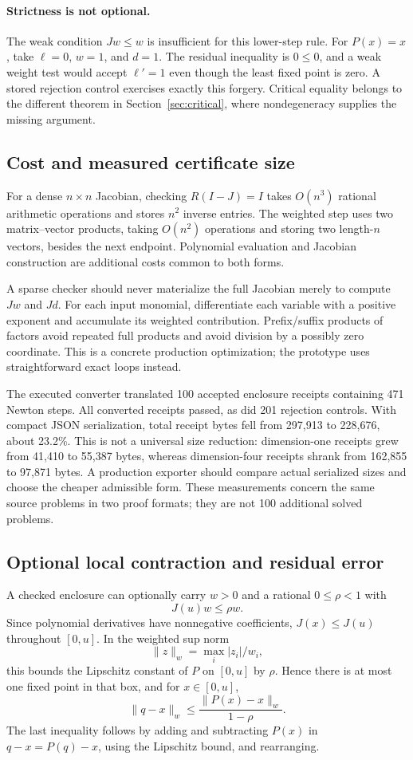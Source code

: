\documentclass[11pt,a4paper]{article}
\theoremstyle{definition}\newtheorem{definition}[theorem]{Definition}
\theoremstyle{remark}\newtheorem{remark}[theorem]{Remark}
\begin{document}
\paragraph{Strictness is not optional.}
The weak condition $Jw\le w$ is insufficient for this lower-step rule. For $P(x)=x$, take $\ell=0$, $w=1$, and $d=1$. The residual inequality is $0\le0$, and a weak weight test would accept $\ell'=1$ even though the least fixed point is zero. A stored rejection control exercises exactly this forgery. Critical equality belongs to the different theorem in Section~\ref{sec:critical}, where nondegeneracy supplies the missing argument.

\subsection{Cost and measured certificate size}
For a dense $n\times n$ Jacobian, checking $R(I-J)=I$ takes $O(n^3)$ rational arithmetic operations and stores $n^2$ inverse entries. The weighted step uses two matrix--vector products, taking $O(n^2)$ operations and storing two length-$n$ vectors, besides the next endpoint. Polynomial evaluation and Jacobian construction are additional costs common to both forms.

A sparse checker should never materialize the full Jacobian merely to compute $Jw$ and $Jd$. For each input monomial, differentiate each variable with a positive exponent and accumulate its weighted contribution. Prefix/suffix products of factors avoid repeated full products and avoid division by a possibly zero coordinate. This is a concrete production optimization; the prototype uses straightforward exact loops instead.

The executed converter translated 100 accepted enclosure receipts containing 471 Newton steps. All converted receipts passed, as did 201 rejection controls. With compact JSON serialization, total receipt bytes fell from 297,913 to 228,676, about 23.2\%. This is not a universal size reduction: dimension-one receipts grew from 41,410 to 55,387 bytes, whereas dimension-four receipts shrank from 162,855 to 97,871 bytes. A production exporter should compare actual serialized sizes and choose the cheaper admissible form. These measurements concern the same source problems in two proof formats; they are not 100 additional solved problems.

\subsection{Optional local contraction and residual error}
A checked enclosure can optionally carry $w>0$ and a rational $0\le\rho<1$ with
\begin{equation}
 \label{eq:contraction}
 J(u)w\le\rho w.
\end{equation}
Since polynomial derivatives have nonnegative coefficients, $J(x)\le J(u)$ throughout $[0,u]$. In the weighted sup norm
\[
 \|z\|_w=\max_i |z_i|/w_i,
\]
this bounds the Lipschitz constant of $P$ on $[0,u]$ by $\rho$. Hence there is at most one fixed point in that box, and for $x\in[0,u]$,
\[
 \|q-x\|_w\le\frac{\|P(x)-x\|_w}{1-\rho}.
\]
The last inequality follows by adding and subtracting $P(x)$ in $q-x=P(q)-x$, using the Lipschitz bound, and rearranging.
\end{document}
